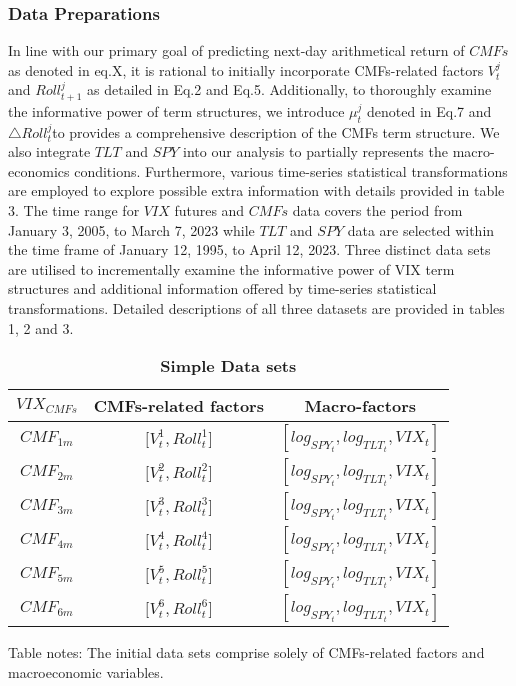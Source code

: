 \documentclass[10pt,letterpaper]{article}
\begin{document}
\subsubsection*{Data Preparations}
In line with our primary goal of predicting next-day arithmetical return of \(CMFs\) as denoted in eq.X, it is rational to initially incorporate CMFs-related factors \(V^j_t\) and \(Roll^j_{t+1}\) as detailed in Eq.2 and Eq.5. Additionally, to thoroughly examine the informative power of term structures, we introduce \(\mu^j_t\) denoted in Eq.7 and \(\triangle Roll_{t}^j\)to provides a comprehensive description of the CMFs term structure. We also integrate \(TLT\) and \(SPY\) into our analysis to partially represents the macro-economics conditions. Furthermore, various time-series statistical transformations are employed to explore possible extra information with details provided in table 3. The time range for \(VIX\)  futures and \(CMFs\)  data covers the period from January 3, 2005, to March 7, 2023 while \(TLT\)  and \(SPY\)  data are selected within the time frame of January 12, 1995, to April 12, 2023. Three distinct data sets are utilised to incrementally examine the informative power of VIX term structures and additional information offered by time-series statistical transformations.
Detailed descriptions of all three datasets are provided in tables 1, 2 and 3.
\begin{table}[!ht]
\centering
\caption{
{\bf Simple Data sets}}
\begin{tabular}{|c|c|c|} %
    \hline %
    \(VIX_{CMFs}\)  & CMFs-related factors & Macro-factors \\
    \hline %
    \(CMF_{1m}\)  & \({[V_{t}^1},{Roll_{t}^1]}\) & \([log_{SPY_t},log_{TLT_t},VIX_t]\) \\
    \hline
    \(CMF_{2m}\)  & \({[V_{t}^2},{Roll_{t}^2]}\)  & \([log_{SPY_t},log_{TLT_t},VIX_t]\) \\
    \hline
    \(CMF_{3m}\)  & \({[V_{t}^3},{Roll_{t}^3]}\) & \([log_{SPY_t},log_{TLT_t},VIX_t]\) \\
    \hline
    \(CMF_{4m}\)& \({[V_{t}^4},{Roll_{t}^4]}\) & \([log_{SPY_t},log_{TLT_t},VIX_t]\)\\
    \hline
    \(CMF_{5m}\) &  \({[V_{t}^5},{Roll_{t}^5]}\) & \([log_{SPY_t},log_{TLT_t},VIX_t]\) \\
    \hline
    \(CMF_{6m}\) & \({[V_{t}^6},{Roll_{t}^6]}\) & \([log_{SPY_t},log_{TLT_t},VIX_t]\) \\
    \hline %
  \end{tabular}
\begin{flushleft} Table notes: The initial data sets comprise solely of CMFs-related factors and macroeconomic variables.
\end{flushleft}
\label{table1}
\end{table}
\end{document}
